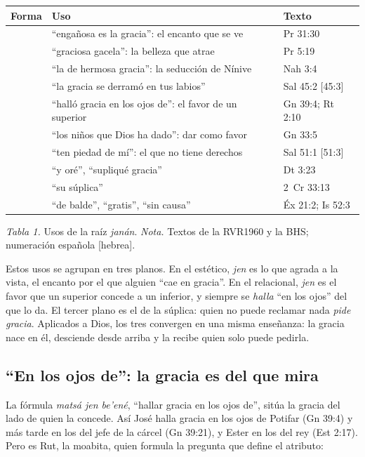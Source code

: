\begin{center}\small\renewcommand{\arraystretch}{1.18}
\begin{tabular}{@{}L{3.6cm}L{7.2cm}L{3.4cm}@{}}
\toprule
\textbf{Forma} & \textbf{Uso} & \textbf{Texto} \\ \midrule
{} & ``engañosa es la gracia'': el encanto que se ve & Pr 31:30 \\
 & ``graciosa gacela'': la belleza que atrae & Pr 5:19 \\
 & ``la de hermosa gracia'': la seducción de Nínive & Nah 3:4 \\
 & ``la gracia se derramó en tus labios'' & Sal 45:2 [45:3] \\
 & ``halló gracia en los ojos de'': el favor de un superior & Gn 39:4; Rt 2:10 \\
 & ``los niños que Dios ha dado'': dar como favor & Gn 33:5 \\
 & ``ten piedad de mí'': el que no tiene derechos & Sal 51:1 [51:3] \\
 & ``y oré'', ``supliqué gracia'' & Dt 3:23 \\
 & ``su súplica'' & 2~Cr 33:13 \\
 & ``de balde'', ``gratis'', ``sin causa'' & Éx 21:2; Is 52:3 \\
\bottomrule
\end{tabular}\par
{\footnotesize\color{gris}\textit{Tabla 1.} Usos de la raíz \emph{janán}. \textit{Nota.} Textos de la RVR1960 y la BHS; numeración española [hebrea].}
\end{center}

Estos usos se agrupan en tres planos. En el estético, \emph{jen} es lo que agrada a la vista, el encanto por el que alguien ``cae en gracia''. En el relacional, \emph{jen} es el favor que un superior concede a un inferior, y siempre se \emph{halla} ``en los ojos'' del que lo da. El tercer plano es el de la súplica: quien no puede reclamar nada \emph{pide gracia}. Aplicados a Dios, los tres convergen en una misma enseñanza: la gracia nace en él, desciende desde arriba y la recibe quien solo puede pedirla.

\subsection{“En los ojos de”: la gracia es del que mira}
La fórmula \emph{matsá jen be'ené}, ``hallar gracia en los ojos de'', sitúa la gracia del lado de quien la concede. Así José halla gracia en los ojos de Potifar (Gn 39:4) y más tarde en los del jefe de la cárcel (Gn 39:21), y Ester en los del rey (Est 2:17). Pero es Rut, la moabita, quien formula la pregunta que define el atributo:

